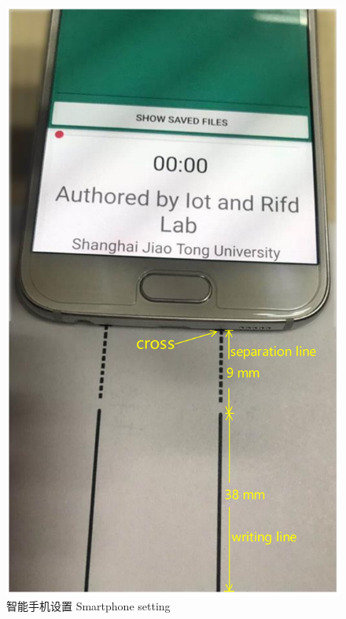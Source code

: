 \begin{figure}
\begin{minipage}[t]{0.32\textwidth}
    \includegraphics[width=\textwidth]{figure/app-smartphone-setting.pdf}
    \bicaption
    {智能手机设置}
    {Smartphone setting}
    \label{fig:smartphone-setting}
   \end{minipage}
   \begin{minipage}[t]{0.32\textwidth}
    \centering

\end{minipage}
\end{figure}
